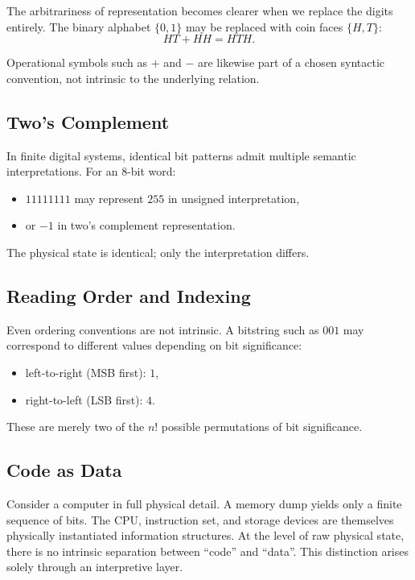 The arbitrariness of representation becomes clearer when we replace the digits entirely.
The binary alphabet $\{0,1\}$ may be replaced with coin faces $\{H,T\}$:
\[
HT + HH = HTH.
\]

Operational symbols such as $+$ and $-$ are likewise part of a chosen syntactic convention, not intrinsic to the underlying relation.

\subsection*{Two's Complement}

In finite digital systems, identical bit patterns admit multiple semantic interpretations.
For an 8-bit word:
\begin{itemize}
\item $11111111$ may represent $255$ in unsigned interpretation,
\item or $-1$ in two's complement representation.
\end{itemize}

The physical state is identical; only the interpretation differs.

\subsection*{Reading Order and Indexing}

Even ordering conventions are not intrinsic.
A bitstring such as $001$ may correspond to different values depending on bit significance:
\begin{itemize}
\item left-to-right (MSB first): $1$,
\item right-to-left (LSB first): $4$.
\end{itemize}

These are merely two of the $n!$ possible permutations of bit significance.

\subsection*{Code as Data}

Consider a computer in full physical detail.
A memory dump yields only a finite sequence of bits.
The CPU, instruction set, and storage devices are themselves physically instantiated information structures.
At the level of raw physical state, there is no intrinsic separation between ``code'' and ``data''.
This distinction arises solely through an interpretive layer.

